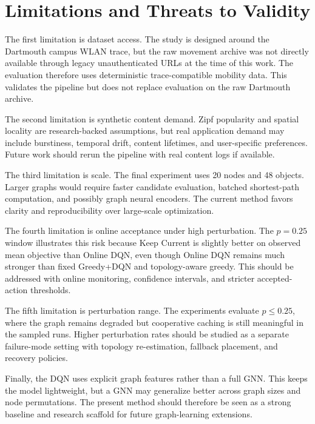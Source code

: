\section{Limitations and Threats to Validity}

The first limitation is dataset access. The study is designed around the Dartmouth campus WLAN trace, but the raw movement archive was not directly available through legacy unauthenticated URLs at the time of this work. The evaluation therefore uses deterministic trace-compatible mobility data. This validates the pipeline but does not replace evaluation on the raw Dartmouth archive.

The second limitation is synthetic content demand. Zipf popularity and spatial locality are research-backed assumptions, but real application demand may include burstiness, temporal drift, content lifetimes, and user-specific preferences. Future work should rerun the pipeline with real content logs if available.

The third limitation is scale. The final experiment uses 20 nodes and 48 objects. Larger graphs would require faster candidate evaluation, batched shortest-path computation, and possibly graph neural encoders. The current method favors clarity and reproducibility over large-scale optimization.

The fourth limitation is online acceptance under high perturbation. The \(p=0.25\) window illustrates this risk because Keep Current is slightly better on observed mean objective than Online DQN, even though Online DQN remains much stronger than fixed Greedy+DQN and topology-aware greedy. This should be addressed with online monitoring, confidence intervals, and stricter accepted-action thresholds.

The fifth limitation is perturbation range. The experiments evaluate \(p\leq 0.25\), where the graph remains degraded but cooperative caching is still meaningful in the sampled runs. Higher perturbation rates should be studied as a separate failure-mode setting with topology re-estimation, fallback placement, and recovery policies.

Finally, the DQN uses explicit graph features rather than a full GNN. This keeps the model lightweight, but a GNN may generalize better across graph sizes and node permutations. The present method should therefore be seen as a strong baseline and research scaffold for future graph-learning extensions.
